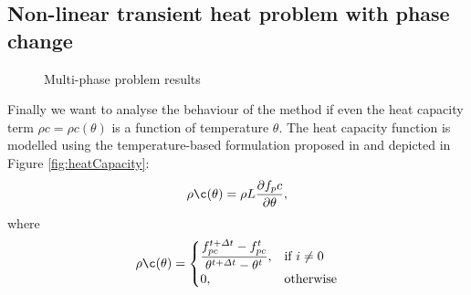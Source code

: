 \documentclass[3p]{article}
\begin{document}
\subsection*{Non-linear transient heat problem with phase change}
\begin{figure}[!h]
\centering
    \caption{Multi-phase problem results}
    \label{MultiPhase}
\end{figure}

Finally we want to analyse the behaviour of the method if even the heat capacity term $\rho c = \rho c(\theta)$ is a function of temperature $\theta$.
The heat capacity function is modelled using the temperature-based formulation proposed in \cite{Celentano1994} and depicted in Figure \ref{fig:heatCapacity}:
\begin{equation}
	\rho\c(\theta) = \rho L \dfrac{\partial f_{p}c}{\partial \theta},
\end{equation}
where
\begin{equation}
	\rho\c(\theta) = 
	\begin{cases}
      \dfrac{f^{t+\Delta t}_{pc}-f^{t}_{pc}}{\theta^{t+\Delta t}-\theta^{t}}, & \text{if}\ i\neq 0 \\
      0, & \text{otherwise}
    \end{cases}
\end{equation}
\end{document}
